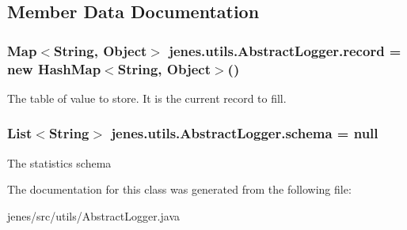 \subsection{Member Data Documentation}
\hypertarget{classjenes_1_1utils_1_1_abstract_logger_ae85e356ad12255a9c5ec8f9f25659ef7}{
\subsubsection[{record}]{\setlength{\rightskip}{0pt plus 5cm}Map$<$String, Object$>$ jenes.\-utils.\-Abstract\-Logger.\-record = new Hash\-Map$<$String, Object$>$()\hspace{0.3cm}{\ttfamily [protected]}}}\label{classjenes_1_1utils_1_1_abstract_logger_ae85e356ad12255a9c5ec8f9f25659ef7}
The table of value to store. It is the current record to fill. \hypertarget{classjenes_1_1utils_1_1_abstract_logger_a3a2030876857a0512fae7e0ad400c570}{
\subsubsection[{schema}]{\setlength{\rightskip}{0pt plus 5cm}List$<$String$>$ jenes.\-utils.\-Abstract\-Logger.\-schema = null\hspace{0.3cm}{\ttfamily [protected]}}}\label{classjenes_1_1utils_1_1_abstract_logger_a3a2030876857a0512fae7e0ad400c570}
The statistics schema 

The documentation for this class was generated from the following file\-:\begin{DoxyCompactItemize}
\item 
jenes/src/utils/Abstract\-Logger.\-java\end{DoxyCompactItemize}
